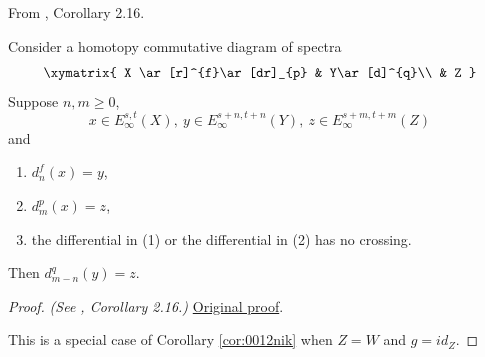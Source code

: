 \begin{corollary}
\label{paper:2.16}
From \cite{LWX126}, Corollary 2.16.\par
\label{cor:166dc180}
    Consider a homotopy commutative diagram of spectra
    $$\xymatrix{
    X \ar[r]^{f}\ar[dr]_{p} & Y\ar[d]^{q}\\
    & Z
    }$$
    Suppose $n,m\ge 0$, 
    $$x\in E^{s,t}_\infty(X), ~y\in E^{s+n,t+n}_\infty(Y), ~z\in E^{s+m,t+m}_\infty(Z)$$
    and
    \begin{enumerate}
        \item $d^{f}_{n}(x)=y$,
        \item $d^{p}_{m}(x)=z$,
        \item the differential in (1) or the differential in (2) has no crossing.
    \end{enumerate}
    Then $d^{q}_{m-n}(y)=z$.

\end{corollary}
\begin{proof}
\textit{(See \cite{LWX126}, Corollary 2.16.)} \href{paper/main.tex.html#L593}{Original proof}.

This is a special case of Corollary \ref{cor:0012nik} when $Z=W$ and $g=id_Z$.
\end{proof}

